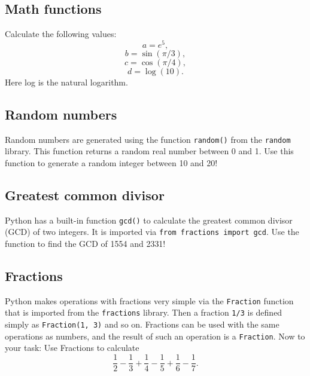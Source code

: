 
\subsection{Math functions}

Calculate the following values:
$$
a = e^5,
$$
$$
b = \sin(\pi/3),
$$
$$
c = \cos(\pi/4),
$$
$$
d = \log(10).
$$
Here log is the natural logarithm.


\subsection{Random numbers}

Random numbers are generated using the function {\tt random()} from the {\tt random}
library. This function returns a random real number between 0 and 1. 
Use this function to generate a random integer between 
10 and 20!


\subsection{Greatest common divisor}

Python has a built-in function {\tt gcd()} to calculate the greatest common divisor (GCD)
of two integers. It is imported via {\tt from fractions import gcd}. Use 
the function to find the GCD of 1554 and 2331!


\subsection{Fractions}

Python makes operations with fractions very simple via the {\tt Fraction}
function that is imported from the {\tt fractions} library. Then 
a fraction {\tt 1/3} is defined simply as {\tt Fraction(1, 3)} and so on. Fractions
can be used with the same operations as numbers, and the result of such 
an operation is a {\tt Fraction}. Now to your task: Use Fractions to 
calculate
$$
\frac{1}{2} - \frac{1}{3} + \frac{1}{4} - \frac{1}{5} + \frac{1}{6} - \frac{1}{7}.
$$

